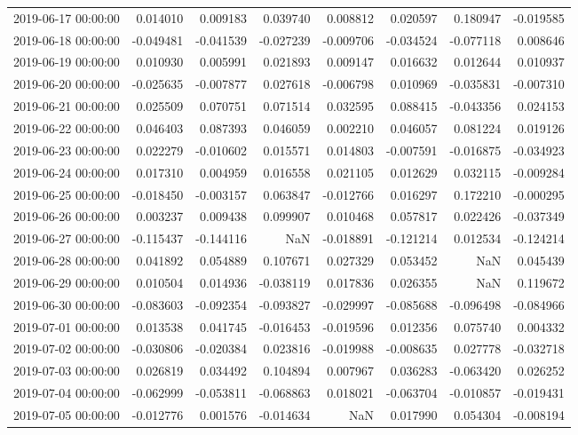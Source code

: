 \begin{tabular}{lrrrrrrr}
2019-06-17 00:00:00 & 0.014010 & 0.009183 & 0.039740 & 0.008812 & 0.020597 & 0.180947 & -0.019585 \\
2019-06-18 00:00:00 & -0.049481 & -0.041539 & -0.027239 & -0.009706 & -0.034524 & -0.077118 & 0.008646 \\
2019-06-19 00:00:00 & 0.010930 & 0.005991 & 0.021893 & 0.009147 & 0.016632 & 0.012644 & 0.010937 \\
2019-06-20 00:00:00 & -0.025635 & -0.007877 & 0.027618 & -0.006798 & 0.010969 & -0.035831 & -0.007310 \\
2019-06-21 00:00:00 & 0.025509 & 0.070751 & 0.071514 & 0.032595 & 0.088415 & -0.043356 & 0.024153 \\
2019-06-22 00:00:00 & 0.046403 & 0.087393 & 0.046059 & 0.002210 & 0.046057 & 0.081224 & 0.019126 \\
2019-06-23 00:00:00 & 0.022279 & -0.010602 & 0.015571 & 0.014803 & -0.007591 & -0.016875 & -0.034923 \\
2019-06-24 00:00:00 & 0.017310 & 0.004959 & 0.016558 & 0.021105 & 0.012629 & 0.032115 & -0.009284 \\
2019-06-25 00:00:00 & -0.018450 & -0.003157 & 0.063847 & -0.012766 & 0.016297 & 0.172210 & -0.000295 \\
2019-06-26 00:00:00 & 0.003237 & 0.009438 & 0.099907 & 0.010468 & 0.057817 & 0.022426 & -0.037349 \\
2019-06-27 00:00:00 & -0.115437 & -0.144116 & NaN & -0.018891 & -0.121214 & 0.012534 & -0.124214 \\
2019-06-28 00:00:00 & 0.041892 & 0.054889 & 0.107671 & 0.027329 & 0.053452 & NaN & 0.045439 \\
2019-06-29 00:00:00 & 0.010504 & 0.014936 & -0.038119 & 0.017836 & 0.026355 & NaN & 0.119672 \\
2019-06-30 00:00:00 & -0.083603 & -0.092354 & -0.093827 & -0.029997 & -0.085688 & -0.096498 & -0.084966 \\
2019-07-01 00:00:00 & 0.013538 & 0.041745 & -0.016453 & -0.019596 & 0.012356 & 0.075740 & 0.004332 \\
2019-07-02 00:00:00 & -0.030806 & -0.020384 & 0.023816 & -0.019988 & -0.008635 & 0.027778 & -0.032718 \\
2019-07-03 00:00:00 & 0.026819 & 0.034492 & 0.104894 & 0.007967 & 0.036283 & -0.063420 & 0.026252 \\
2019-07-04 00:00:00 & -0.062999 & -0.053811 & -0.068863 & 0.018021 & -0.063704 & -0.010857 & -0.019431 \\
2019-07-05 00:00:00 & -0.012776 & 0.001576 & -0.014634 & NaN & 0.017990 & 0.054304 & -0.008194 \\

\end{tabular}
